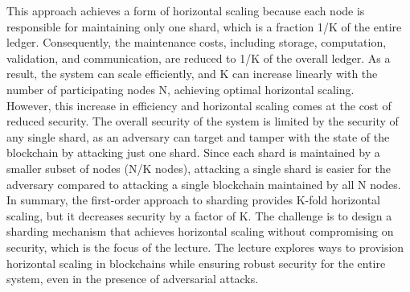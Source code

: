 This approach achieves a form of horizontal scaling because each node is responsible for maintaining only one shard, which is a fraction 1/K of the entire ledger. Consequently, the maintenance costs, including storage, computation, validation, and communication, are reduced to 1/K of the overall ledger. As a result, the system can scale efficiently, and K can increase linearly with the number of participating nodes N, achieving optimal horizontal scaling.\\
However, this increase in efficiency and horizontal scaling comes at the cost of reduced security. The overall security of the system is limited by the security of any single shard, as an adversary can target and tamper with the state of the blockchain by attacking just one shard. Since each shard is maintained by a smaller subset of nodes (N/K nodes), attacking a single shard is easier for the adversary compared to attacking a single blockchain maintained by all N nodes.\\
In summary, the first-order approach to sharding provides K-fold horizontal scaling, but it decreases security by a factor of K. The challenge is to design a sharding mechanism that achieves horizontal scaling without compromising on security, which is the focus of the lecture. The lecture explores ways to provision horizontal scaling in blockchains while ensuring robust security for the entire system, even in the presence of adversarial attacks.
